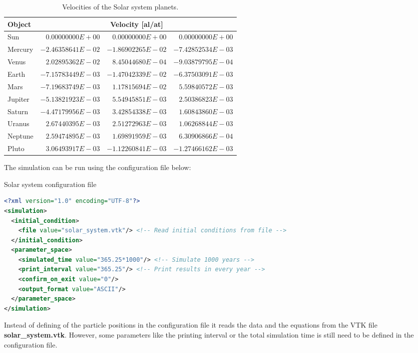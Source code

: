 \documentclass[a4paper,12pt,openany]{book}
\theoremstyle{break}
\begin{document}
\begin{table} [H]
\begin{center}
\caption{Velocities of the Solar system planets.}\label{tbl:solarsystemvel}
\begin{tabular}{ l r r r }
\toprule[1.5pt]
\bf Object & \multicolumn{3}{c}{\bf Velocity [al/at]} \\
\midrule
Sun & $0.00000000E+00$  &  $0.00000000E+00$  &  $0.00000000E+00$ \\
Mercury & $-2.46358641E-02$  &  $-1.86902265E-02$  &  $-7.42852534E-03$ \\
Venus & $2.02895362E-02$  &  $8.45044680E-04$  &  $-9.03879795E-04$ \\
Earth & $-7.15783449E-03$  &  $-1.47042339E-02$  &  $-6.37503091E-03$ \\
Mars & $-7.19683749E-03$  &  $1.17815694E-02$  &  $5.59840572E-03$ \\
Jupiter & $-5.13821923E-03$  &  $5.54945851E-03$  &  $2.50386823E-03$ \\
Saturn & $-4.47179956E-03$  &  $3.42854338E-03$  &  $1.60843860E-03$ \\
Uranus & $2.67440395E-03$  &  $2.51272963E-03$  &  $1.06268844E-03$ \\
Neptune & $2.59474895E-03$  &  $1.69891959E-03$  &  $6.30906866E-04$ \\
Pluto & $3.06493917E-03$  &  $-1.12260841E-03$  &  $-1.27466162E-03$ \\
\bottomrule[1.25pt]
\end{tabular}
\end{center}
\end{table}
The simulation can be run using the configuration file below:
\begin{samepage}
\begin{example}{Solar system configuration file}{}
\lstset{basicstyle=\tiny}
\begin{lstlisting}[language=XML]
<?xml version="1.0" encoding="UTF-8"?>
<simulation>
  <initial_condition>
    <file value="solar_system.vtk"/> <!-- Read initial conditions from file -->
  </initial_condition>
  <parameter_space>
    <simulated_time value="365.25*1000"/> <!-- Simulate 1000 years -->
    <print_interval value="365.25"/> <!-- Print results in every year -->
    <confirm_on_exit value="0"/>
    <output_format value="ASCII"/>
  </parameter_space>
</simulation>
\end{lstlisting}
\end{example}
\end{samepage}
Instead of defining of the particle positions in the configuration file it reads the data and the equations from the VTK file \textbf{solar\_system.vtk}. However, some parameters like the printing interval or the total simulation time is still need to be defined in the configuration file.
\end{document}
